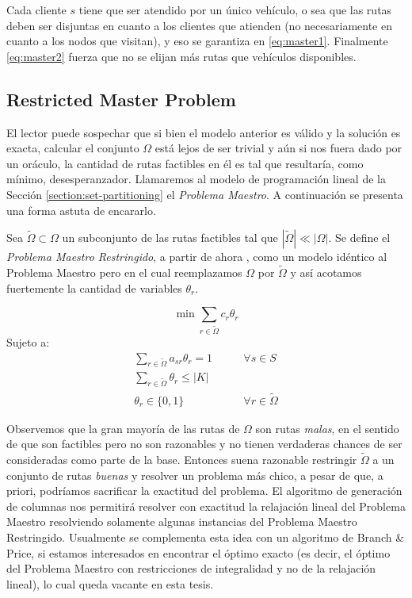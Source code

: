 Cada cliente $s$ tiene que ser atendido por un único vehículo, o sea que las rutas deben ser disjuntas en cuanto a los clientes que atienden (no necesariamente en cuanto a los nodos que visitan), y eso se garantiza en \ref{eq:master1}. Finalmente \ref{eq:master2} fuerza que no se elijan más rutas que vehículos disponibles.

\subsection{Restricted Master Problem}
\label{section:rmp}

El lector puede sospechar que si bien el modelo anterior es válido y la solución es exacta, calcular el conjunto $\Omega$ está lejos de ser trivial y aún si nos fuera dado por un oráculo, la cantidad de rutas factibles en él es tal que resultaría, como mínimo, desesperanzador. Llamaremos al modelo de programación lineal de la Sección \ref{section:set-partitioning} el \emph{Problema Maestro}. A continuación se presenta una forma astuta de encararlo.

Sea $\tilde{\Omega} \subset \Omega$ un subconjunto de las rutas factibles  tal que $|\tilde{\Omega}| \ll |\Omega|$. Se define el \emph{Problema Maestro Restringido}, a partir de ahora , como un modelo idéntico al Problema Maestro pero en el cual reemplazamos $\Omega$ por $\tilde{\Omega}$ y así acotamos fuertemente la cantidad de variables $\theta_r$. 

\begin{equation}
    \min \sum_{r \in \tilde{\Omega}} c_r  \theta_r
\end{equation}
Sujeto a:
\begin{align}
    \sum_{r \in \tilde{\Omega}} {a_{sr}\theta_r} = 1
\qquad & \forall {s \in S} \label{eq:rmp1} \\
\sum_{r \in \tilde{\Omega}}{\theta_r} \leq |K| & \label{eq:rmp2} \\
\theta_r \in \{0, 1\} \qquad & \forall{r \in \tilde{\Omega}}
\end{align}

Observemos que la gran mayoría de las rutas de $\Omega$ son rutas \emph{malas}, en el sentido de que son factibles pero no son razonables y no tienen verdaderas chances de ser consideradas como parte de la base. Entonces suena razonable restringir $\tilde{\Omega}$ a un conjunto de rutas \emph{buenas} y resolver un problema más chico, a pesar de que, a priori, podríamos sacrificar la exactitud del problema. El algoritmo de generación de columnas nos permitirá resolver con exactitud la relajación lineal del Problema Maestro resolviendo solamente algunas instancias del Problema Maestro Restringido. Usualmente se complementa esta idea con un algoritmo de Branch \& Price, si estamos interesados en encontrar el óptimo exacto (es decir, el óptimo del Problema Maestro con restricciones de integralidad y no de la relajación lineal), lo cual queda vacante en esta tesis.	

